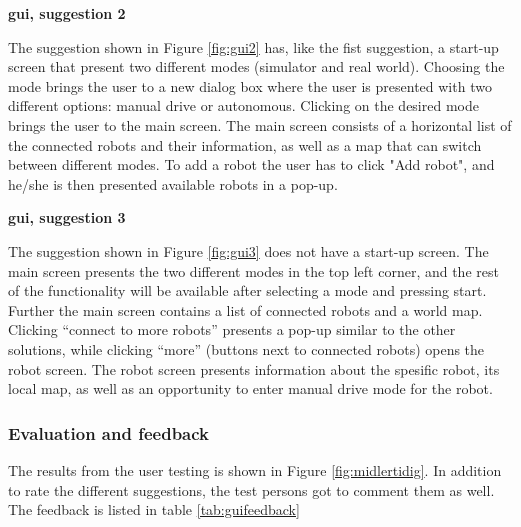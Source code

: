 \textbf{\acrlong{gui}, suggestion 2}

The suggestion shown in Figure \ref{fig:gui2} has, like the fist suggestion, a start-up screen that present two different modes (simulator and real world). Choosing the mode brings the user to a new dialog box where the user is presented with two different options: manual drive or autonomous. Clicking on the desired mode brings the user to the main screen. The main screen consists of a horizontal list of the connected robots and their information, as well as a map that can switch between different modes. To add a robot the user has to click "Add robot", and he/she is then presented available robots in a pop-up.

\textbf{\acrlong{gui}, suggestion 3}

The suggestion shown in Figure \ref{fig:gui3} does not have a start-up screen. The main screen presents the two different modes in the top left corner, and the rest of the functionality will be available after selecting a mode and pressing start. Further the main screen contains a list of connected robots and a world map. Clicking ``connect to more robots'' presents a pop-up similar to the other solutions, while clicking ``more'' (buttons next to connected robots) opens the robot screen. The robot screen presents information about the spesific robot, its local map, as well as an opportunity to enter manual drive mode for the robot.

\subsubsection{Evaluation and feedback}
The results from the user testing is shown in Figure \ref{fig:midlertidig}. In addition to rate the different suggestions, the test persons got to comment them as well. The feedback is listed in table \ref{tab:guifeedback}


